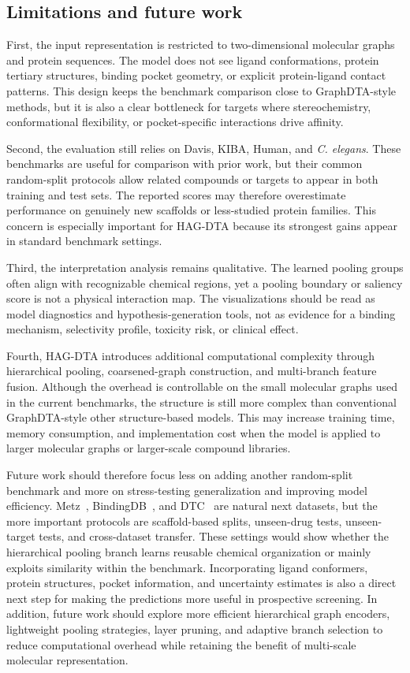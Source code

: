\documentclass[pdflatex,sn-mathphys-num]{sn-jnl}%
\theoremstyle{thmstyleone}%
\theoremstyle{thmstyletwo}%
\theoremstyle{thmstylethree}%
\begin{document}
\subsection{Limitations and future work}
First, the input representation is restricted to two-dimensional molecular graphs and protein sequences. The model does not see ligand conformations, protein tertiary structures, binding pocket geometry, or explicit protein-ligand contact patterns. This design keeps the benchmark comparison close to GraphDTA-style methods, but it is also a clear bottleneck for targets where stereochemistry, conformational flexibility, or pocket-specific interactions drive affinity.

Second, the evaluation still relies on Davis, KIBA, Human, and \textit{C. elegans}. These benchmarks are useful for comparison with prior work, but their common random-split protocols allow related compounds or targets to appear in both training and test sets. The reported scores may therefore overestimate performance on genuinely new scaffolds or less-studied protein families. This concern is especially important for HAG-DTA because its strongest gains appear in standard benchmark settings.

Third, the interpretation analysis remains qualitative. The learned pooling groups often align with recognizable chemical regions, yet a pooling boundary or saliency score is not a physical interaction map. The visualizations should be read as model diagnostics and hypothesis-generation tools, not as evidence for a binding mechanism, selectivity profile, toxicity risk, or clinical effect.

Fourth, HAG-DTA introduces additional computational complexity through hierarchical pooling, coarsened-graph construction, and multi-branch feature fusion. Although the overhead is controllable on the small molecular graphs used in the current benchmarks, the structure is still more complex than conventional GraphDTA-style other structure-based models. This may increase training time, memory consumption, and implementation cost when the model is applied to larger molecular graphs or larger-scale compound libraries.

Future work should therefore focus less on adding another random-split benchmark and more on stress-testing generalization and improving model efficiency. Metz~\cite{metz2011navigating}, BindingDB~\cite{gilson2016bindingdb}, and DTC~\cite{tang2018drug} are natural next datasets, but the more important protocols are scaffold-based splits, unseen-drug tests, unseen-target tests, and cross-dataset transfer. These settings would show whether the hierarchical pooling branch learns reusable chemical organization or mainly exploits similarity within the benchmark. Incorporating ligand conformers, protein structures, pocket information, and uncertainty estimates is also a direct next step for making the predictions more useful in prospective screening. In addition, future work should explore more efficient hierarchical graph encoders, lightweight pooling strategies, layer pruning, and adaptive branch selection to reduce computational overhead while retaining the benefit of multi-scale molecular representation.
\end{document}
